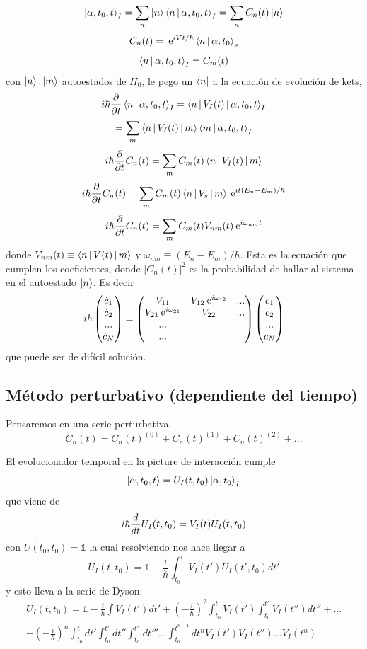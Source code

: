 \documentclass[10pt,oneside]{CBFT_book}
\begin{document}
\[
	\Ket{\alpha,t_0,t}_I = \sum_n \Ket{n}\Braket{n|\alpha,t_0,t}_I = \sum_n C_n(t) \Ket{n}
\]
\[
	C_n(t) = \:\mathrm{e}^{iVt/\hbar} \Braket{n|\alpha,t_0}_s
\]
\[
	\Braket{n|\alpha,t_0,t}_I = C_m(t)
\]
con $\Ket{n},\ket{m}$ autoestados de $H_0$, le pego un $\Bra{n}$ a la ecuación de evolución de kets,
\[
	i\hbar \frac{\partial^{\hspace{-0.05em}} {}}{\partial {t}^{\hspace{-0.05em}}} \Braket{n|\alpha,t_0,t}_I = \Braket{n|V_I(t)|\alpha,t_0,t}_I
\]
\[
	= \sum_m \Braket{n|V_I(t)|m}\Braket{m|\alpha,t_0,t}_I
\]
\[
	i\hbar \frac{\partial^{\hspace{-0.05em}} {}}{\partial {t}^{\hspace{-0.05em}}}C_n(t) = \sum_m C_m(t) \Braket{n|V_I(t)|m}
\]
\[
	i\hbar \frac{\partial^{\hspace{-0.05em}} {}}{\partial {t}^{\hspace{-0.05em}}}C_n(t) = \sum_m C_m(t) \Braket{n|V_s|m} \:\mathrm{e}^{it(E_n-E_m)/\hbar}
\]
\[
	i\hbar \frac{\partial^{\hspace{-0.05em}} {}}{\partial {t}^{\hspace{-0.05em}}}C_n(t) = \sum_m C_m(t) V_{nm}(t) \:\mathrm{e}^{i\omega_{nm}t}
\]
donde $V_{nm}(t) \equiv \Braket{n|V(t)|m}$ y $\omega_{nm} \equiv (E_n-E_m)/\hbar$.
Esta es la ecuación que cumplen los coeficientes, donde $|C_n(t)|^2$ es la probabilidad de hallar al sistema 
en el autoestado $\Ket{n}$.
Es decir
\[
	i\hbar \begin{pmatrix}
	\dot{c}_1 \\ \dot{c}_2 \\ ... \\ \dot{c}_N \\
	\end{pmatrix} 
	=
	\begin{pmatrix}
	V_{11} & V_{12}\:\mathrm{e}^{i\omega_{12}} & ... \\ V_{21}\:\mathrm{e}^{i\omega_{21}} & V_{22} & ... \\ ... \\ ... \\
	\end{pmatrix}
	\begin{pmatrix}
	c_1 \\ c_2 \\ ... \\ c_N \\
	\end{pmatrix} 
\]
que puede ser de difícil solución.

\subsection{Método perturbativo (dependiente del tiempo)}

Pensaremos en una serie perturbativa 
\[
	C_n(t) = C_n(t)^{(0)} + C_n(t)^{(1)}  + C_n(t)^{(2)}  + ...
\]

El evolucionador temporal en la picture de interacción cumple 
\[
	\Ket{\alpha,t_0,t} = U_I(t,t_0)\Ket{\alpha,t_0}_I
\]
que viene de  
\[
	i\hbar \frac{d^{\hspace{-0.05em}} {}}{d {t}^{\hspace{-0.05em}}} U_I(t,t_0) = V_I(t) U_I(t,t_0)
\]
con $U(t_0,t_0)=\mathbb{1}$ la cual resolviendo nos hace llegar a 
\[
	U_I(t,t_0) = \mathbb{1} - \frac{i}{\hbar}\int_{t_0}^{t} V_I(t')U_I(t',t_0) dt'
\]
y esto lleva a la serie de Dyson:
\begin{multline*}
	U_I(t,t_0) = \mathbb{1} - \frac{i}{\hbar}\int V_I(t') dt' + \left( -\frac{i}{\hbar} \right)^2\int_{t_0}^t 
	V_I(t') \int_{t_0}^{t'}V_I(t'')dt'' + ...\\ + \left( -\frac{i}{\hbar} \right)^n 
	\int_{t_0}^t dt'\int_{t_0}^{t'}dt''\int_{t_0}^{t''}dt''' ... \int_{t_0}^{t^{n-1}}dt^{n} V_I(t') 
	V_I(t'')...V_I(t^n)	
\end{multline*}
\end{document}

